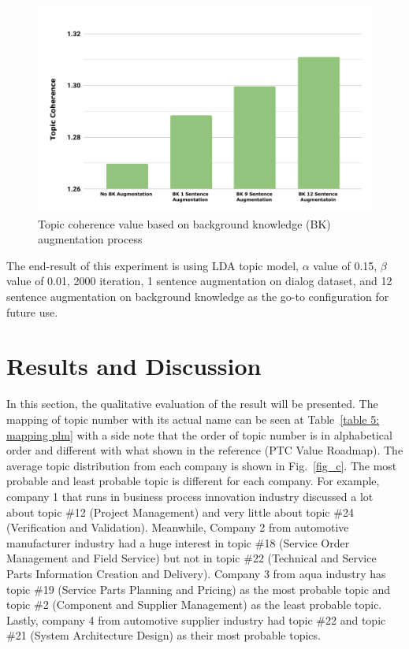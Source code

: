 \documentclass[10pt, conference, compsocconf]{IEEEtran}
\begin{document}
\begin{figure}[t]
	\includegraphics[scale=0.425]{new-topic2.pdf}
	\caption{Topic coherence value based on background knowledge (BK) augmentation process}
\label{fig_tme2}
\end{figure}

The end-result of this experiment is using LDA topic model, $\alpha$ value of 0.15, $\beta$ value of 0.01, 2000 iteration, 1 sentence augmentation on dialog dataset, and 12 sentence augmentation on background knowledge as the go-to configuration for future use.

\section{Results and Discussion}
In this section, the qualitative evaluation of the result will be presented. The mapping of topic number with its actual name can be seen at Table~\ref{table 5: mapping plm} with a side note that the order of topic number is in alphabetical order and different with what shown in the reference (PTC Value Roadmap). The average topic distribution from each company is shown in Fig.~\ref{fig_c}.  The most probable and least probable topic is different for each company. For example, company 1 that runs in business process innovation industry discussed a lot about topic \#12 (Project Management) and very little about topic \#24 (Verification and Validation). Meanwhile, Company 2 from automotive manufacturer industry had a huge interest in topic \#18 (Service Order Management and Field Service) but not in topic \#22 (Technical and Service Parts Information Creation and Delivery). Company 3 from aqua industry has topic \#19 (Service Parts Planning and Pricing) as the most probable topic and topic \#2 (Component and Supplier Management) as the least probable topic. Lastly, company 4 from automotive supplier industry had topic \#22 and topic \#21 (System Architecture Design) as their most probable topics.
\end{document}
